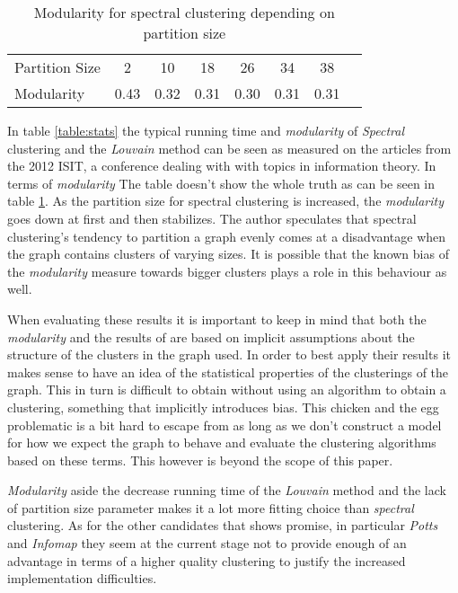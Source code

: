 \begin{table}
	\small
\begin{tabular}{l*{7}{c}}
	 Partition Size & 2 & 10 & 18 & 26 & 34 & 38 \\
	\noalign{\smallskip} 
	Modularity & 0.43 & 0.32 & 0.31 & 0.30 & 0.31 & 0.31
\end{tabular}
\caption{Modularity for spectral clustering depending on partition size}
\label{table:partition_size}
\end{table}

In table \ref{table:stats} the typical running time and 
\emph{modularity} of \emph{Spectral} clustering and the \emph{Louvain} 
method can be seen as measured on the articles from the 2012 ISIT, a 
conference dealing with with topics in information theory. In terms of 
\emph{modularity} The table doesn't show the whole truth as can be seen 
in table \ref{table:partition_size}. As the partition size for spectral 
clustering is increased, the \emph{modularity} goes down at first and 
then stabilizes.  The author speculates that spectral clustering's 
tendency to partition a graph evenly comes at a disadvantage when the 
graph contains clusters of varying sizes. It is possible that the known 
bias of the \emph{modularity} measure towards bigger clusters plays a 
role in this behaviour as well.

When evaluating these results it is important to keep in mind that both 
the \emph{modularity} and the results of \cite{lancichinetti2009} are 
based on implicit assumptions about the structure of the clusters in the 
graph used. In order to best apply their results it makes sense to have 
an idea of the statistical properties of the clusterings of the graph.  
This in turn is difficult to obtain without using an algorithm to obtain 
a clustering, something that implicitly introduces bias. This chicken 
and the egg problematic is a bit hard to escape from as long as we don't 
construct a model for how we expect the graph to behave and evaluate the 
clustering algorithms based on these terms. This however is beyond the 
scope of this paper.

\emph{Modularity} aside the decrease running time of the \emph{Louvain} 
method and the lack of partition size parameter makes it a lot more 
fitting choice than \emph{spectral} clustering. As for the other 
candidates that shows promise, in particular \emph{Potts} and 
\emph{Infomap} they seem at the current stage not to provide enough of 
an advantage in terms of a higher quality clustering to justify the 
increased implementation difficulties.



